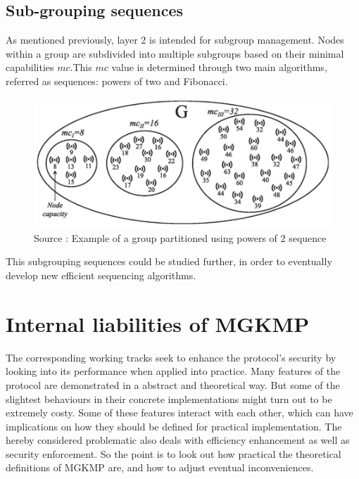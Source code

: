 \subsection{Sub-grouping sequences}
\label{subsec:subgroups}

As mentioned previously, layer 2 is intended for subgroup management. Nodes within a group are subdivided into multiple subgroups based on their minimal capabilities $mc$.This $mc$ value is determined through two main algorithms, referred as sequences: powers of two and Fibonacci.

\begin{figure}[htbp]
	\centerline{\includegraphics[scale=0.60]{figures/mgkmp/power2.png}}
	\caption{Source \cite{kandi_versatile_2020}: Example of a group partitioned using powers of 2 sequence}
	\label{fig:power2}
\end{figure}

This subgrouping sequences could be studied further, in order to eventually develop new efficient sequencing algorithms.

\section{Internal liabilities of MGKMP}
\label{sec:mgkmp_liabilities}

The corresponding working tracks seek to enhance the protocol’s security by looking into its performance when applied into practice. Many features of the protocol are demonstrated in a abstract and theoretical way. But some of the slightest behaviours in their concrete implementations might turn out to be extremely costy. Some of these features interact with each other, which can have implications on how they should be defined for practical implementation. The hereby considered problematic also deals with efficiency enhancement as well as security enforcement. So the point is to look out how practical the theoretical definitions of MGKMP are, and how to adjust eventual inconveniences.

